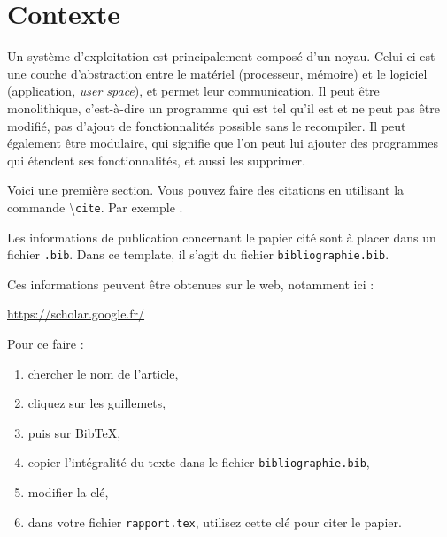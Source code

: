 \documentclass[a4paper, 12pt]{article}
\begin{document}
\newpage		
\tableofcontents %



\clearpage 

\section{Contexte}
Un système d'exploitation est principalement composé d'un noyau. Celui-ci est une couche d'abstraction entre le matériel (processeur, mémoire) et le logiciel (application, \emph{user space}), et permet leur communication. Il peut être monolithique, c'est-à-dire un programme qui est tel qu'il est et ne peut pas être modifié, pas d'ajout de fonctionnalités possible sans le recompiler. Il peut également être modulaire, qui signifie que l'on peut lui ajouter des programmes qui étendent ses fonctionnalités, et aussi les supprimer. 

Voici une première section. Vous pouvez faire des citations en utilisant la commande \textbackslash\texttt{cite}. Par exemple \cite{DH76}.

Les informations de publication concernant le papier cité sont à placer dans un fichier \texttt{.bib}. Dans ce template, il s'agit du fichier \texttt{bibliographie.bib}.

Ces informations peuvent être obtenues sur le web, notamment ici : 
\begin{center}
\url{https://scholar.google.fr/}
\end{center}


Pour ce faire :
\begin{enumerate}
\item chercher le nom de l'article,
\item cliquez sur les guillemets,
\item puis sur BibTeX,
\item copier l'intégralité du texte dans le fichier \texttt{bibliographie.bib},
\item modifier la clé,
\item dans votre fichier \texttt{rapport.tex}, utilisez cette clé pour citer le papier.
\end{enumerate} 
\end{document}
